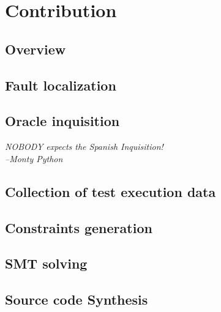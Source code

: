 \chapter{Contribution}
\section{Overview}


\label{flow_graph}

\section{Fault localization}

\section{Oracle inquisition}
{\begin{small}%
\begin{flushright}%
\it
NOBODY expects the Spanish Inquisition! \\
--Monty Python
\end{flushright}%
\end{small}%
\vspace{.5cm}}

\section{Collection of test execution data}

\section{Constraints generation}

\section{SMT solving}

\section{Source code Synthesis}

